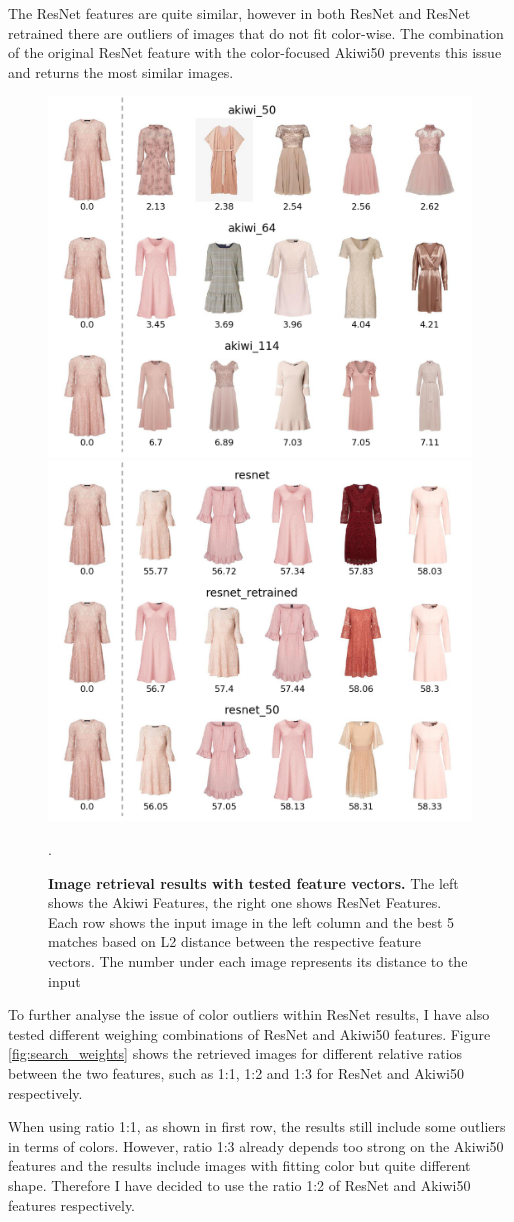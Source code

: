 \documentclass[12pt]{report}
\begin{document}
The ResNet features are quite similar, however in both ResNet and ResNet retrained there are outliers of images that do not fit color-wise. The combination of the original ResNet feature with the color-focused Akiwi50 prevents this issue and returns the most similar images. 

\begin{figure}[h]
\centering
{\includegraphics[width=.48\linewidth]{04_experiments/retrieval/akiwi_pink}}\hspace{0.2cm}
{\includegraphics[width=.48\linewidth]{04_experiments/retrieval/resnet_pink}}
\caption{\label{fig:search_pink} \textbf{Image retrieval results with tested feature vectors.} The left shows the Akiwi Features, the right one shows ResNet Features. Each row shows the input image in the left column and the best 5 matches based on L2 distance between the respective feature vectors. The number under each image represents its distance to the input}.
\end{figure}

To further analyse the issue of color outliers within ResNet results, I have also tested different weighing combinations of ResNet and Akiwi50 features. Figure \ref{fig:search_weights} shows the retrieved images for different relative ratios between the two features, such as 1:1, 1:2 and 1:3 for ResNet and Akiwi50 respectively. 

When using ratio 1:1, as shown in first row, the results still include some outliers in terms of colors. However, ratio 1:3 already depends too strong on the Akiwi50 features and the results include images with fitting color but quite different shape. Therefore I have decided to use the ratio 1:2 of ResNet and Akiwi50 features respectively.
\end{document}
